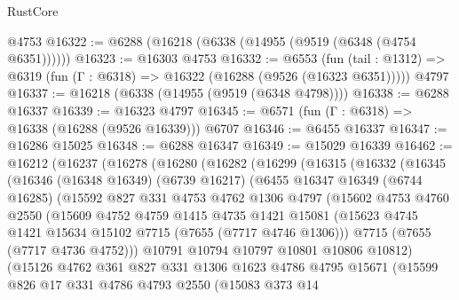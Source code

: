 \begin{lexlean}{RustCore}
\begin{coremodule}
    @4753
@16322 := @6288 (@16218 (@6338 (@14955 (@9519 (@6348 (@4754 @6351))))))
@16323 := @16303 @4753
@16332 := @6553
    (fun (tail : @1312) => @6319 (fun (Γ : @6318) => @16322 (@16288 (@9526 (@16323 @6351)))))
    @4797
@16337 := @16218 (@6338 (@14955 (@9519 (@6348 @4798))))
@16338 := @6288 @16337
@16339 := @16323 @4797
@16345 := @6571 (fun (Γ : @6318) => @16338 (@16288 (@9526 @16339))) @6707
@16346 := @6455 @16337
@16347 := @16286 @15025
@16348 := @6288 @16347
@16349 := @15029 @16339
@16462 := @16212
    (@16237
      (@16278
        (@16280
          (@16282
            (@16299
              (@16315
                (@16332
                  (@16345
                    (@16346
                      (@16348 @16349)
                      (@6739 @16217)
                      (@6455
                        @16347
                        @16349
                        (@6744 @16285)
                        (@15592
                          @827
                          @331
                          @4753
                          @4762
                          @1306
                          @4797
                          (@15602
                            @4753
                            @4760
                            @2550
                            (@15609
                              @4752
                              @4759
                              @1415
                              @4735
                              @1421
                              @15081
                              (@15623 @4745 @1421 @15634 @15102 @7715 (@7655 (@7717 @4746 @1306)))
                              @7715
                              (@7655 (@7717 @4736 @4752)))
                            @10791
                            @10794
                            @10797
                            @10801
                            @10806
                            @10812)
                          (@15126
                            @4762
                            @361
                            @827
                            @331
                            @1306
                            @1623
                            @4786
                            @4795
                            @15671
                            (@15599
                              @826
                              @17
                              @331
                              @4786
                              @4793
                              @2550
                              (@15083
                                @373
                                @14

\end{coremodule}
\end{lexlean}
